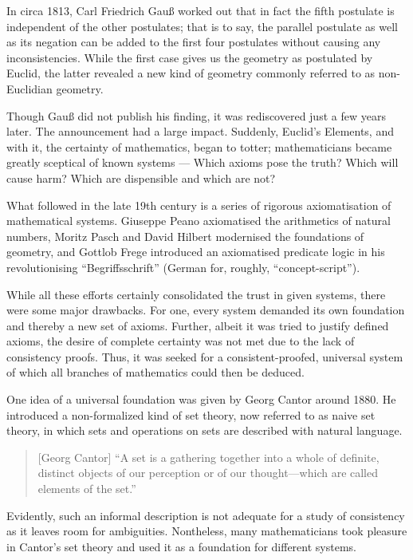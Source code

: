 \documentclass[hidelinks]{article}
\theoremstyle{plain}
\theoremstyle{definition}
\theoremstyle{rem}
\begin{document}
In circa 1813, Carl Friedrich Gauß worked out that in fact the fifth postulate is independent of the other postulates; that is to say, the parallel postulate as well as its negation can be added to the first four postulates without causing any inconsistencies. While the first case gives us the geometry as postulated by Euclid, the latter revealed a new kind of geometry commonly referred to as non-Euclidian geometry.

Though Gauß did not publish his finding, it was rediscovered just a few years later. The announcement had a large impact. Suddenly, Euclid's Elements, and with it, the certainty of mathematics, began to totter; mathematicians became greatly sceptical of known systems --- Which axioms pose the truth? Which will cause harm? Which are dispensible and which are not?

What followed in the late 19th century is a series of rigorous axiomatisation of mathematical systems. Giuseppe Peano axiomatised the arithmetics of natural numbers, Moritz Pasch and David Hilbert modernised the foundations of geometry, and Gottlob Frege introduced an axiomatised predicate logic in his revolutionising ``Begriffsschrift'' (German for, roughly, ``concept-script'').

While all these efforts certainly consolidated the trust in given systems, there were some major drawbacks. For one, every system demanded its own foundation and thereby a new set of axioms. Further, albeit it was tried to justify defined axioms, the desire of complete certainty was not met due to the lack of consistency proofs. Thus, it was seeked for a consistent-proofed, universal system of which all branches of mathematics could then be deduced.

One idea of a universal foundation was given by Georg Cantor around 1880. He introduced a non-formalized kind of set theory, now referred to as naive set theory, in which sets and operations on sets are described with natural language. 

\begin{quote}[Georg Cantor]
``A set is a gathering together into a whole of definite, distinct objects of our perception or of our thought—which are called elements of the set.''\cite{cantor_set}
\end{quote}

Evidently, such an informal description is not adequate for a study of consistency as it leaves room for ambiguities. Nontheless, many mathematicians took pleasure in Cantor's set theory and used it as a foundation for different systems.
\end{document}
